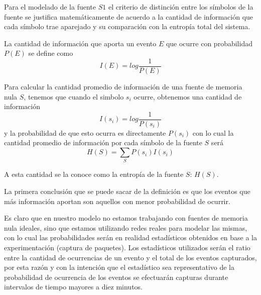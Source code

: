 Para el modelado de la fuente $S1$ el criterio de distinción entre los símbolos de la fuente se justifica  matemáticamente de acuerdo a la cantidad de información que cada símbolo trae aparejado y su comparación con la entropía total del sistema.

La cantidad de información que aporta un evento $E$ que ocurre con probabilidad $P(E)$ se define como 
\[I(E) = log \frac{1}{P(E)}\]

Para calcular la cantidad promedio de información de una fuente de memoria nula $S$, tenemos que cuando el simbolo $s_i$ ocurre, obtenemos una cantidad de información 
\[I(s_i) = log \frac{1}{P(s_i)}\]
y la probabilidad de que esto ocurra es directamente $P(s_i)$ con lo cual la cantidad promedio de información por cada símbolo de la fuente $S$ será
\[H(S) = \sum_{S} P(s_i) I(s_i)\]

A esta cantidad se la conoce como la entropía de la fuente $S$: $H(S)$.

La primera conclusión que se puede sacar de la definición es que los eventos que más información aportan son aquellos con menor probabilidad de ocurrir.

Es claro que en nuestro modelo no estamos trabajando con fuentes de memoria nula ideales, sino que estamos utilizando redes reales para modelar las mismas, con lo cual las probabilidades serán en realidad estadísticos obtenidos en base a la experimentación (captura de paquetes). Los estadísticos utilizados serán el ratio entre la cantidad de ocurrencias de un evento y el total de los eventos capturados, por esta razón y con la intención que el estadístico sea representativo de la probabilidad de ocurrencia de los eventos se efectuarán capturas durante intervalos de tiempo mayores a diez minutos.

